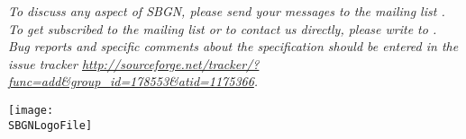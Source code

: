 \begin{titlepage}
\begin{center}
\vspace*{1em}

\vfill

\normalsize
\begin{minipage}{5in}
  \emph{To discuss any aspect of SBGN, please send your messages to the mailing list .  To get subscribed to the mailing list or to contact us directly, please write to . Bug reports and specific comments about the specification should be entered in the issue tracker \url{http://sourceforge.net/tracker/?func=add&group_id=178553&atid=1175366}.  }
\end{minipage}

\vfill

\centerline{\texttt{[image: \\SBGNLogoFile]}}

\end{center}

\end{titlepage}

%
%

\setcounter{page}{2}